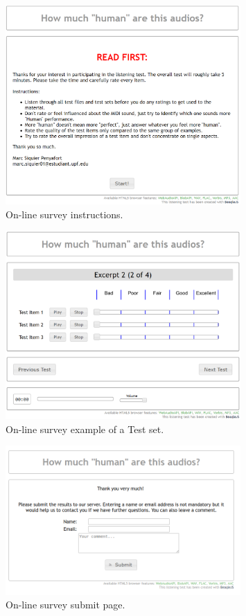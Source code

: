 \begin{appendices}
\begin{figure}[ht!]
\centering 
\includegraphics[width=0.8\textwidth]{Figures/survey_instructions.PNG}
\caption{On-line survey instructions.}
\label{fig_app:survey_instructions}
\end{figure}

\begin{figure}[ht!]
\centering
\includegraphics[width=0.8\textwidth]{Figures/survey_test.PNG}
\caption{On-line survey example of a Test set.}
\label{fig_app:survey_test}
\end{figure}

\begin{figure}[ht!]
\centering
\includegraphics[width=0.8\textwidth]{Figures/survey_end.png}
\caption{On-line survey submit page.}
\label{fig_app:survey_end}
\end{figure}


\end{appendices}
